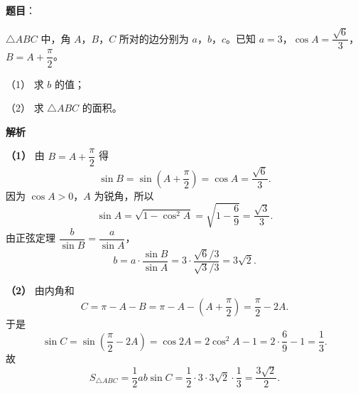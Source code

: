 \begin{answer}

\textbf{题目}：

$\triangle ABC$ 中，角 $A$，$B$，$C$ 所对的边分别为 $a$，$b$，$c$。已知 $a=3$，$\cos A=\dfrac{\sqrt6}3$，$B=A+\dfrac\pi2$。

（1） 求 $b$ 的值；

（2） 求 $\triangle ABC$ 的面积。

\textbf{解析}

\textbf{（1）} 由 $B=A+\dfrac\pi2$ 得
\nopagebreak[4]
\[\sin B=\sin\left(A+\frac\pi2\right)=\cos A=\frac{\sqrt6}3 .\]
因为 $\cos A>0$，$A$ 为锐角，所以
\nopagebreak[4]
\[\sin A=\sqrt{1-\cos^2A}=\sqrt{1-\frac69}=\frac{\sqrt3}3 .\]
由正弦定理 $\dfrac b{\sin B}=\dfrac a{\sin A}$，
\nopagebreak[4]
\[b=a\cdot\frac{\sin B}{\sin A}
=3\cdot\frac{\sqrt6/3}{\sqrt3/3}=3\sqrt2 .\]

\textbf{（2）} 由内角和
\nopagebreak[4]
\[C=\pi-A-B=\pi-A-\left(A+\frac\pi2\right)=\frac\pi2-2A .\]
于是
\nopagebreak[4]
\[\sin C=\sin\left(\frac\pi2-2A\right)=\cos2A=2\cos^2A-1
=2\cdot\frac69-1=\frac13 .\]
故
\nopagebreak[4]
\[S_{\triangle ABC}=\frac12ab\sin C
=\frac12\cdot3\cdot3\sqrt2\cdot\frac13
=\frac{3\sqrt2}2 .\]



\end{answer}
